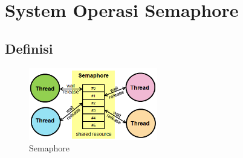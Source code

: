 \section{System Operasi Semaphore}

	\subsection{Definisi}
	
		\begin{figure}[ht]
			\centerline{\includegraphics[width=0.5\textwidth]{figures/sema.png}}
			\caption{Semaphore}
			\label{sema}
			\end{figure}
	
